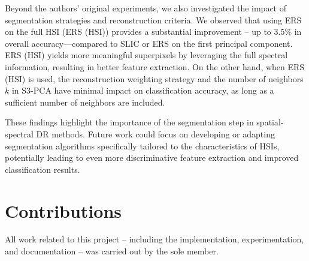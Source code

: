 \documentclass[twoside,english]{article}
\begin{document}
Beyond the authors' original experiments, we also investigated the impact of segmentation strategies and reconstruction criteria. We observed that using ERS on the full HSI (ERS (HSI)) provides a substantial improvement -- up to 3.5\% in overall accuracy—compared to SLIC or ERS on the first principal component. ERS (HSI) yields more meaningful superpixels by leveraging the full spectral information, resulting in better feature extraction. On the other hand, when ERS (HSI) is used, the reconstruction weighting strategy and the number of neighbors $k$ in S3-PCA have minimal impact on classification accuracy, as long as a sufficient number of neighbors are included.

These findings highlight the importance of the segmentation step in spatial-spectral DR methods. Future work could focus on developing or adapting segmentation algorithms specifically tailored to the characteristics of HSIs, potentially leading to even more discriminative feature extraction and improved classification results.
 
\section{Contributions} \label{sec:contribution}
All work related to this project -- including the implementation, experimentation, and documentation -- was carried out by the sole member.



\end{document}
